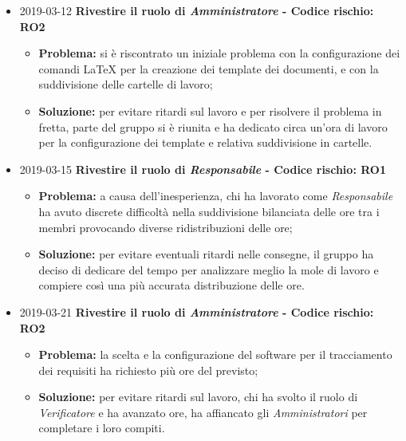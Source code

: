 \begin{itemize}

		\item 2019-03-12 \textbf{Rivestire il ruolo di \textit{Amministratore} - Codice rischio: RO2} \\
		\begin{itemize}
			\item \textbf{Problema:} si è riscontrato un iniziale problema con la configurazione dei comandi \LaTeX{} per la creazione dei template dei documenti, e con la suddivisione delle cartelle di lavoro;
			\item \textbf{Soluzione:} per evitare ritardi sul lavoro e per risolvere il problema in fretta, parte del gruppo si è riunita e ha dedicato circa un'ora di lavoro per la configurazione dei template e relativa suddivisione in cartelle.
		\end{itemize}	
		
		\item 2019-03-15 \textbf{Rivestire il ruolo di \textit{Responsabile} - Codice rischio: RO1} \\
		\begin{itemize}
			\item \textbf{Problema:} a causa dell'inesperienza, chi ha lavorato come \textit{Responsabile} ha avuto discrete
		difficoltà nella suddivisione bilanciata delle ore tra i membri provocando 
		diverse ridistribuzioni delle ore;
			\item \textbf{Soluzione:} per evitare eventuali ritardi nelle consegne, il gruppo ha deciso di dedicare 
		del tempo per analizzare meglio la mole di lavoro e compiere così una più
		accurata distribuzione delle ore.
		\end{itemize}
		
						
		\item 2019-03-21 \textbf{Rivestire il ruolo di \textit{Amministratore} - Codice rischio: RO2} \\
		\begin{itemize}
			\item \textbf{Problema:} la scelta e la configurazione del software per il tracciamento dei requisiti
		ha richiesto più ore del previsto;
			\item \textbf{Soluzione:} per evitare ritardi sul lavoro, chi ha svolto il ruolo di \textit{Verificatore}
		e ha avanzato ore, ha affiancato gli \textit{Amministratori} per completare 
		i loro compiti.
		\end{itemize}
		
\end{itemize}
